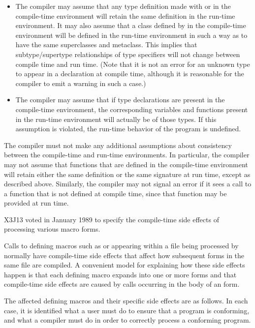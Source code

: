 \begin{itemize}
\item The compiler may assume that any type definition made with  
        or  in the compile-time environment will retain the same 
        definition in the run-time environment.  It may also assume that
        a class defined by  in the compile-time environment will
        be defined in the run-time environment in such a way as to have
        the same superclasses and metaclass.  This implies that
        subtype/supertype relationships of type specifiers will not 
        change between compile time and run time.  (Note that it is not 
        an error for an	unknown type to appear in a declaration at
        compile time, although it is reasonable for the compiler to 
        emit a warning in such a case.)

\item The compiler may assume that if type declarations are present
	in the compile-time environment, the corresponding variables and 
	functions present in the run-time environment will actually be of
	those types.  If this assumption is violated, the run-time behavior of the program is 
	undefined.
\end{itemize}

The compiler must not make any additional assumptions about
consistency between the compile-time and run-time environments.  In 
particular, the compiler may not assume that functions that are defined
	in the compile-time environment will retain either the
	same definition or the same signature at run time, except
as described above.
Similarly,
the compiler may not signal an error if it sees a call to a
	function that is not defined at compile time, since that function
	may be provided at run time.

X3J13 voted in January 1989 
to specify the compile-time side effects of processing various macro forms.

Calls to defining macros such as  or  appearing
    within a file being processed by  normally have
    compile-time side effects that affect how subsequent forms in the
    same file are compiled.  A convenient model for explaining how these
    side effects happen is that each defining macro expands into one or
    more  forms and that compile-time
    side effects are caused by calls occurring in the body of an
     form.

The affected defining macros and their specific side effects are
    as follows.  In each case, it is identified what a user must do to
    ensure that a program is conforming, and what a compiler must do
    in order to correctly process a conforming program.

